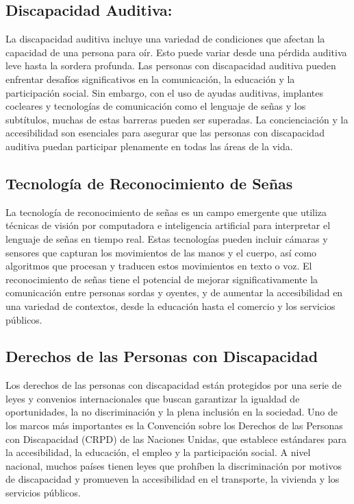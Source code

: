 \subsection{Discapacidad Auditiva: }
La discapacidad auditiva incluye una variedad de condiciones que afectan la capacidad de una persona para oír. Esto puede variar desde una pérdida auditiva leve hasta la sordera profunda. Las personas con discapacidad auditiva pueden enfrentar desafíos significativos en la comunicación, la educación y la participación social. Sin embargo, con el uso de ayudas auditivas, implantes cocleares y tecnologías de comunicación como el lenguaje de señas y los subtítulos, muchas de estas barreras pueden ser superadas. La concienciación y la accesibilidad son esenciales para asegurar que las personas con discapacidad auditiva puedan participar plenamente en todas las áreas de la vida.
\subsection{Tecnología de Reconocimiento de Señas}
La tecnología de reconocimiento de señas es un campo emergente que utiliza técnicas de visión por computadora e inteligencia artificial para interpretar el lenguaje de señas en tiempo real. Estas tecnologías pueden incluir cámaras y sensores que capturan los movimientos de las manos y el cuerpo, así como algoritmos que procesan y traducen estos movimientos en texto o voz. El reconocimiento de señas tiene el potencial de mejorar significativamente la comunicación entre personas sordas y oyentes, y de aumentar la accesibilidad en una variedad de contextos, desde la educación hasta el comercio y los servicios públicos.
\subsection{Derechos de las Personas con Discapacidad}
Los derechos de las personas con discapacidad están protegidos por una serie de leyes y convenios internacionales que buscan garantizar la igualdad de oportunidades, la no discriminación y la plena inclusión en la sociedad. Uno de los marcos más importantes es la Convención sobre los Derechos de las Personas con Discapacidad (CRPD) de las Naciones Unidas, que establece estándares para la accesibilidad, la educación, el empleo y la participación social. A nivel nacional, muchos países tienen leyes que prohíben la discriminación por motivos de discapacidad y promueven la accesibilidad en el transporte, la vivienda y los servicios públicos.
